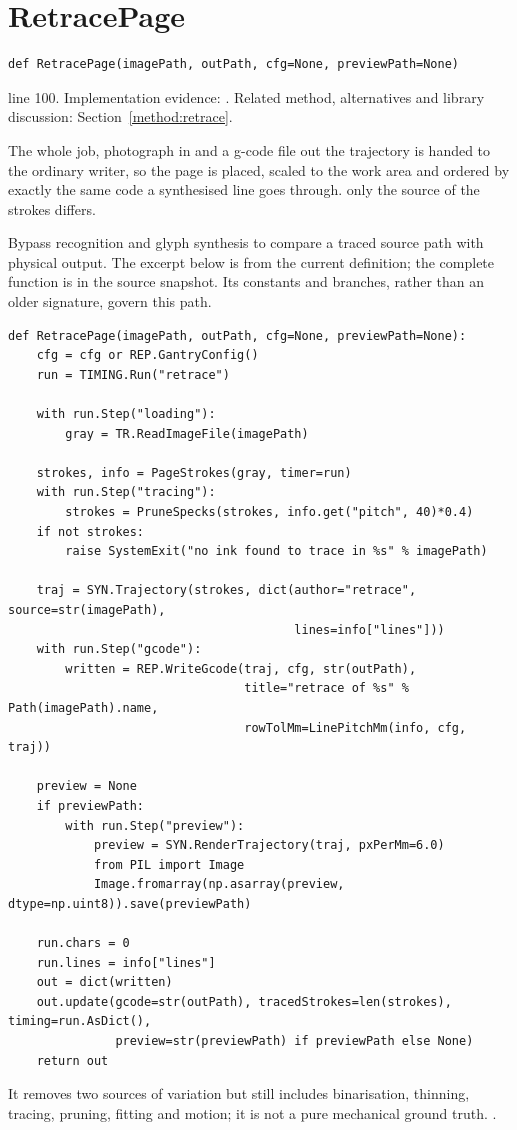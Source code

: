 \section{RetracePage}\label{fn:retrace:RetracePage}
\begin{lstlisting}[style=sig]
def RetracePage(imagePath, outPath, cfg=None, previewPath=None)
\end{lstlisting}
 line 100. Implementation evidence: \cite{code2026}. Related method, alternatives and library discussion: Section~\ref{method:retrace}.


The whole job, photograph in and a g-code file out the trajectory is handed to the ordinary writer, so the page is placed, scaled to the work area and ordered by exactly the same code a synthesised line goes through.  only the source of the strokes differs.


Bypass recognition and glyph synthesis to compare a traced source path with physical output. The excerpt below is from the current definition; the complete function is in the source snapshot. Its constants and branches, rather than an older signature, govern this path.


\begin{lstlisting}[style=plain]
def RetracePage(imagePath, outPath, cfg=None, previewPath=None):
    cfg = cfg or REP.GantryConfig()
    run = TIMING.Run("retrace")

    with run.Step("loading"):
        gray = TR.ReadImageFile(imagePath)

    strokes, info = PageStrokes(gray, timer=run)
    with run.Step("tracing"):
        strokes = PruneSpecks(strokes, info.get("pitch", 40)*0.4)
    if not strokes:
        raise SystemExit("no ink found to trace in %s" % imagePath)

    traj = SYN.Trajectory(strokes, dict(author="retrace", source=str(imagePath),
                                        lines=info["lines"]))
    with run.Step("gcode"):
        written = REP.WriteGcode(traj, cfg, str(outPath),
                                 title="retrace of %s" % Path(imagePath).name,
                                 rowTolMm=LinePitchMm(info, cfg, traj))

    preview = None
    if previewPath:
        with run.Step("preview"):
            preview = SYN.RenderTrajectory(traj, pxPerMm=6.0)
            from PIL import Image
            Image.fromarray(np.asarray(preview, dtype=np.uint8)).save(previewPath)

    run.chars = 0
    run.lines = info["lines"]
    out = dict(written)
    out.update(gcode=str(outPath), tracedStrokes=len(strokes), timing=run.AsDict(),
               preview=str(previewPath) if previewPath else None)
    return out
\end{lstlisting}
It removes two sources of variation but still includes binarisation, thinning, tracing, pruning, fitting and motion; it is not a pure mechanical ground truth. \cite{code2026,zhangsuen1984,douglaspeucker1973}.


